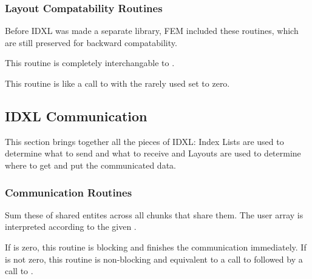 \subsubsection{Layout Compatability Routines}

Before IDXL was made a separate library, FEM included these routines,
which are still preserved for backward compatability.


This routine is completely interchangable to .



This routine is like a call to  with the rarely
used  set to zero.



\subsection{IDXL Communication}
\label{sec:IDXLComm}
This section brings together all the pieces of IDXL: Index Lists are used to determine what to send and what to receive and Layouts are used to determine where to get and put the communicated data.


\subsubsection{Communication Routines}


Sum these  of shared entites across all chunks that share them.
The user  array is interpreted according to the given .

If  is zero, this routine is blocking and finishes the communication immediately.
If  is not zero, this routine is non-blocking and equivalent to a call to 
 followed by a call to .


